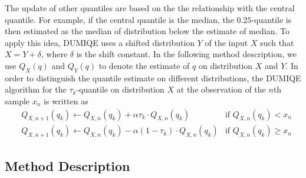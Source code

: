 The update of other quantiles are based on the the relationship with the central quantile. For example, if the central quantile is the median, the $0.25$-quantile is then estimated as the median of distribution below the estimate of median. To apply this idea, DUMIQE uses a shifted distribution $Y$ of the input $X$ such that $X = Y + \delta$, where $\delta$ is the shift constant. In the following method description, we use $Q_X(q)$ and  $Q_Y(q)$ to denote the estimate of $q$ on distribution $X$ and $Y$. In order to distinguish the quantile estimate on different distributions, the DUMIQE algorithm for the $\tau_k$-quantile on distribution $X$ at the observation of the $n$th sample $x_n$ is written as 
\begin{align}
        &Q_{X, n+1}(q_k) \leftarrow Q_{X, n}(q_k) + \alpha \tau_k \cdot Q_{X, n}(q_k)  & \text{if } Q_{X, n}(q_k) < x_n \\
        &Q_{X, n+1}(q_k) \leftarrow Q_{X, n}(q_k) - \alpha (1-\tau_k) \cdot Q_{X, n}(q_k)  & \text{if } Q_{X, n}(q_k) \geq x_n \nonumber
\end{align}

\subsection{Method Description}
\label{subsec: multi_shiftQ_description}


